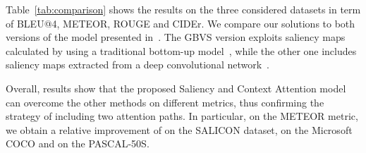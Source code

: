Table~\ref{tab:comparison} shows the results on the three considered datasets in term of BLEU@4, METEOR, ROUGE and CIDEr.
We compare our solutions to both versions of the model presented in~\cite{tavakoli2017can}. The GBVS version exploits saliency maps calculated by using a traditional bottom-up model~\cite{harel2006graph}, while the other one includes saliency maps extracted from a deep convolutional network~\cite{tavakoli2017exploiting}.

Overall, results show that the proposed Saliency and Context Attention model can overcome the other methods on different metrics, thus confirming the strategy of including two attention paths. In particular, on the METEOR metric, we obtain a relative improvement of  on the SALICON dataset,  on the Microsoft COCO and  on the PASCAL-50S.


